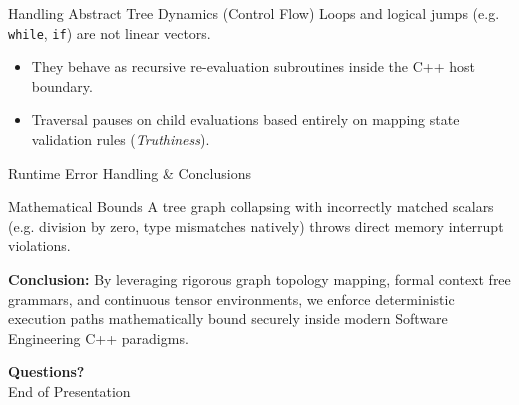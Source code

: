 \documentclass[aspectratio=169]{beamer}
\begin{document}
\begin{frame}{Handling Abstract Tree Dynamics (Control Flow)}
    Loops and logical jumps (e.g. \texttt{while}, \texttt{if}) are not linear vectors.
    \begin{itemize}
        \item They behave as recursive re-evaluation subroutines inside the C++ host boundary.
        \item Traversal pauses on child evaluations based entirely on mapping state validation rules (\textit{Truthiness}).
    \end{itemize}
\end{frame}

\begin{frame}{Runtime Error Handling \& Conclusions}
    \begin{alertblock}{Mathematical Bounds}
        A tree graph collapsing with incorrectly matched scalars (e.g. division by zero, type mismatches natively) throws direct memory interrupt violations.
    \end{alertblock}
    \vspace{0.5cm}
    \textbf{Conclusion:} 
    By leveraging rigorous graph topology mapping, formal context free grammars, and continuous tensor environments, we enforce deterministic execution paths mathematically bound securely inside modern Software Engineering C++ paradigms.
\end{frame}

\begin{frame}
    \begin{center}
        \Huge \textbf{Questions?} \\
        \vspace{0.5cm}
        \large End of Presentation
    \end{center}
\end{frame}
\end{document}
